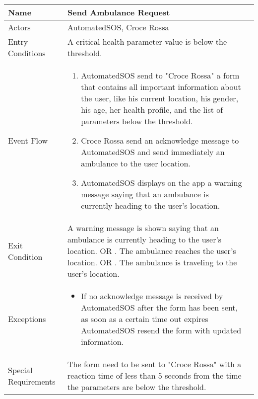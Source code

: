 \begin{table}[h]
\begin{tabular}{|l|l p{3cm}|}
\hline
Name             & Send Ambulance Request \\ \hline
Actors           & AutomatedSOS, Croce Rossa  \\ \hline
Entry Conditions & A critical health parameter value is below the threshold. \\ \hline
Event Flow       & \parbox{\textwidth}{\begin{enumerate}
            \item AutomatedSOS send to "Croce Rossa" a form that contains all important information about the user, like his current location, his gender, his age, her health profile, and the list of parameters below the threshold.
            \item Croce Rossa send an acknowledge message to AutomatedSOS and send immediately an ambulance to the user location.
            \item AutomatedSOS displays on the app a warning message saying that an ambulance is currently heading to the user's location. 
        \end{enumerate}}\\ \hline
Exit Condition   & \parbox{\textwidth}{A warning message is shown saying that an ambulance is currently heading to the user's location. OR . The ambulance reaches the user's location. OR . The ambulance is traveling to the user's location.} \\ \hline
Exceptions       & \parbox{\textwidth}  
{\begin{itemize}
\item If no acknowledge message is received by AutomatedSOS after the form has been sent, as soon as a certain time out expires AutomatedSOS resend the form with updated information. \end{itemize}}\\ \hline
Special Requirements   & The form need to be sent to "Croce Rossa" with a reaction time of less than 5 seconds from the time the parameters are below the threshold. \\ \hline
\end{tabular}
\end{table}

